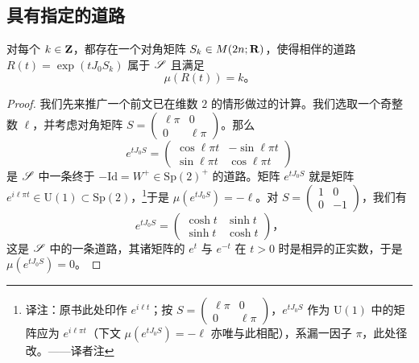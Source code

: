 \subsection{具有指定\trMaslovIndex{}的道路}
\label{subsec:prescribed-maslov-index}

\begin{lemma}\label{thm:prescribed-maslov-index}
对每个 $k\in\mathbf{Z}$，都存在一个对角矩阵 $S_k\in M(2n;\mathbf{R})$，使得相伴的道路 $R(t)=\exp(tJ_0S_k)$ 属于 $\mathscr{S}$ 且满足
\[
\mu(R(t))=k\text{。}
\]
\end{lemma}

\begin{proof}
我们先来推广一个前文已在维数 $2$ 的情形做过的计算。我们选取一个奇整数 $\ell$，并考虑对角矩阵 $S=\begin{pmatrix}\ell\pi&0\\0&\ell\pi\end{pmatrix}$。那么
\[
e^{tJ_0S}=\begin{pmatrix}\cos\ell\pi t&-\sin\ell\pi t\\ \sin\ell\pi t&\cos\ell\pi t\end{pmatrix}
\]
是 $\mathscr{S}$ 中一条终于 $-\mathrm{Id}=W^{+}\in\mathrm{Sp}(2)^{+}$ 的道路。矩阵 $e^{tJ_0S}$ 就是\trUnitary{}矩阵 $e^{i\ell\pi t}\in\mathrm{U}(1)\subset\mathrm{Sp}(2)$，\footnote{译注：原书此处印作 $e^{i\ell t}$；按 $S=\begin{pmatrix}\ell\pi&0\\0&\ell\pi\end{pmatrix}$，$e^{tJ_0S}$ 作为 $\mathrm{U}(1)$ 中的矩阵应为 $e^{i\ell\pi t}$（下文 $\mu(e^{tJ_0S})=-\ell$ 亦唯与此相配），系漏一因子 $\pi$，此处径改。——译者注}于是 $\mu(e^{tJ_0S})=-\ell$。对 $S=\begin{pmatrix}1&0\\0&-1\end{pmatrix}$，我们有
\[
e^{tJ_0S}=\begin{pmatrix}\cosh t&\sinh t\\ \sinh t&\cosh t\end{pmatrix}\text{，}
\]
这是 $\mathscr{S}$ 中的一条道路，其诸矩阵的\trEigenvalue{} $e^{t}$ 与 $e^{-t}$ 在 $t>0$ 时是相异的正实数，于是 $\mu(e^{tJ_0S})=0$。


\end{proof}
